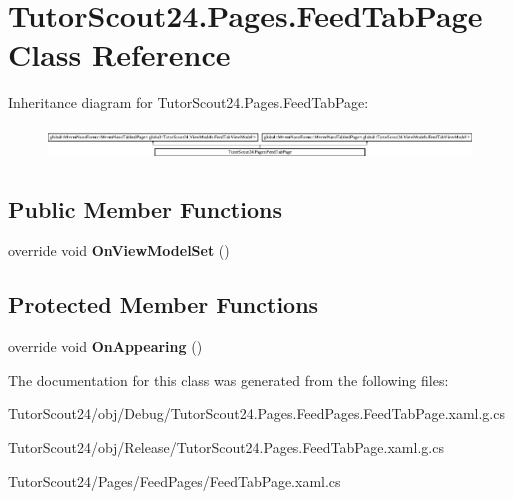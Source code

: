 \hypertarget{class_tutor_scout24_1_1_pages_1_1_feed_tab_page}{}\section{Tutor\+Scout24.\+Pages.\+Feed\+Tab\+Page Class Reference}
\label{class_tutor_scout24_1_1_pages_1_1_feed_tab_page}
Inheritance diagram for Tutor\+Scout24.\+Pages.\+Feed\+Tab\+Page\+:\begin{figure}[H]
\begin{center}
\leavevmode
\includegraphics[height=0.890302cm]{class_tutor_scout24_1_1_pages_1_1_feed_tab_page}
\end{center}
\end{figure}
\subsection*{Public Member Functions}
\begin{DoxyCompactItemize}
\item 
\mbox{\label{class_tutor_scout24_1_1_pages_1_1_feed_tab_page_a969c17311b88b285f05ecc16d9126147}} 
override void {\bfseries On\+View\+Model\+Set} ()
\end{DoxyCompactItemize}
\subsection*{Protected Member Functions}
\begin{DoxyCompactItemize}
\item 
\mbox{\label{class_tutor_scout24_1_1_pages_1_1_feed_tab_page_a65667e250156d692bf31ef1b83541ae7}} 
override void {\bfseries On\+Appearing} ()
\end{DoxyCompactItemize}


The documentation for this class was generated from the following files\+:\begin{DoxyCompactItemize}
\item 
Tutor\+Scout24/obj/\+Debug/Tutor\+Scout24.\+Pages.\+Feed\+Pages.\+Feed\+Tab\+Page.\+xaml.\+g.\+cs\item 
Tutor\+Scout24/obj/\+Release/Tutor\+Scout24.\+Pages.\+Feed\+Tab\+Page.\+xaml.\+g.\+cs\item 
Tutor\+Scout24/\+Pages/\+Feed\+Pages/Feed\+Tab\+Page.\+xaml.\+cs\end{DoxyCompactItemize}

